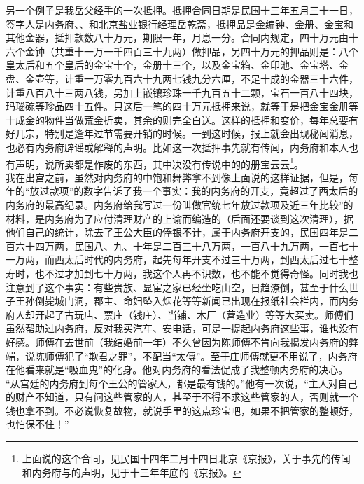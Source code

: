 另一个例子是我岳父经手的一次抵押。抵押合同日期是民国十三年五月三十一日，签字人是内务府、、和北京盐业银行经理岳乾斋，抵押品是金编钟、金册、金宝和其他金器，抵押款数八十万元，期限一年，月息一分。合同内规定，四十万元由十六个金钟（共重十一万一千四百三十九两）做押品，另四十万元的押品则是：八个皇太后和五个皇后的金宝十个，金册十三个，以及金宝箱、金印池、金宝塔、金盘、金壶等，计重一万零九百六十九两七钱九分六厘，不足十成的金器三十六件，计重八百八十三两八钱，另加上嵌镶珍珠一千九百五十二颗，宝石一百八十四块，玛瑙碗等珍品四十五件。只这后一笔的四十万元抵押来说，就等于是把金宝金册等十成金的物件当做荒金折卖，其余的则完全白送。这样的抵押和变价，每年总要有好几宗，特别是逢年过节需要开销的时候。一到这时候，报上就会出现秘闻消息，也必有内务府辟谣或解释的声明。比如这一次抵押事先就有传闻，内务府和本人也有声明，说所卖都是作废的东西，其中决没有传说中的的册宝云云\footnote{上面说的这个合同，见民国十四年二月十四日北京《京报》，关于事先的传闻和内务府与的声明，见于十三年年底的《京报》。}。\\

我在出宫之前，虽然对内务府的中饱和舞弊拿不到像上面说的这样证据，但是，每年的“放过款项”的数字告诉了我一个事实：我的内务府的开支，竟超过了西太后的内务府的最高纪录。内务府给我写过一份叫做官统七年放过款项及近三年比较”的材料，是内务府为了应付清理财产的上谕而编造的（后面还要谈到这次清理），据他们自己的统计，除去了王公大臣的俸银不计，属于内务府开支的，民国四年是二百六十四万两，民国八、九、十年是二百三十八万两，一百八十九万两，一百七十一万两，而西太后时代的内务府，起先每年开支不过三十万两，到西太后过七十整寿时，也不过才加到七十万两，我这个人再不识数，也不能不觉得奇怪。同时我也注意到了这个事实：有些贵族、显宦之家已经坐吃山空，日趋潦倒，甚至于什么世子王孙倒毙城门洞，郡主、命妇坠入烟花等等新闻已出现在报纸社会栏内，而内务府人却开起了古玩店、票庄（钱庄）、当铺、木厂（营造业）等等大买卖。师傅们虽然帮助过内务府，反对我买汽车、安电话，可是一提起内务府这些事，谁也没有好感。师傅在去世前（我结婚前一年）不久曾因为陈师傅不肯向我揭发内务府的弊端，说陈师傅犯了“欺君之罪”，不配当“太傅”。至于庄师傅就更不用说了，内务府在他看来就是“吸血鬼”的化身。他对内务府的看法促成了我整顿内务府的决心。\\

“从宫廷的内务府到每个王公的管家人，都是最有钱的。”他有一次说，“主人对自己的财产不知道，只有问这些管家的人，甚至于不得不求这些管家的人，否则就一个钱也拿不到。不必说恢复故物，就说手里的这点珍宝吧，如果不把管家的整顿好，也怕保不住！”\\

